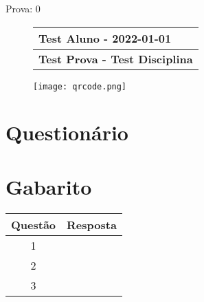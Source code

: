 \documentclass[addpoints,answers]{exam}%
\begin{document}
%
\normalsize%
\ID Prova: {0}%


\begin{figure}[htbp]%
\centering%
\begin{tabular}{p{5.5in}}%
\textbf{Test Aluno {-} 2022{-}01{-}01}\\%
\hline%
\textbf{Test Prova {-} Test Disciplina}\\%
\end{tabular}%
\begin{minipage}{1\textwidth}%
\texttt{[image: qrcode.png]}%
\label{fig:qrcode}%
\end{minipage}%
\end{figure}

%
\centering%
\section*{Questionário}%
\label{sec:Questionrio}%

%
\begin{questions}%
%
\begin{choices}%
%
%
%
\end{choices}%
%
\begin{choices}%
%
%
%
\end{choices}%
%
\begin{choices}%
%
%
%
\end{choices}%
\end{questions}%
\section*{Gabarito}%
\label{sec:Gabarito}%

%
\begin{tabular}{|c|c|}%
\hline%
Questão&Resposta\\%
\hline%
1&\\%
\hline%
2&\\%
\hline%
3&\\%
\hline%
\end{tabular}%
\end{document}
